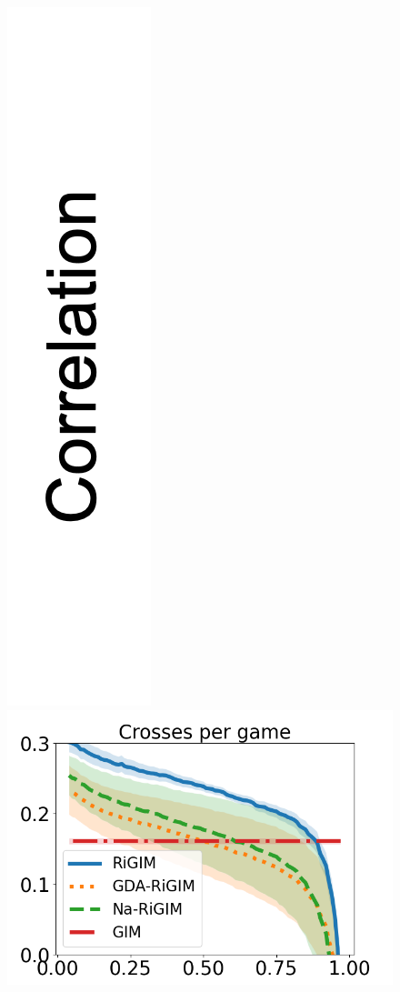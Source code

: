 \documentclass{article}
\begin{document}
\begin{figure}[htbp]
\begin{minipage}{0.01\textwidth}
    \includegraphics[scale=0.12]{figures/correlation_y_label.png}
    \end{minipage}
    \begin{minipage}{0.16\textwidth}
    \centering
    \includegraphics[scale=0.14]{figures/soccer_risk_curve_Crosses_shadow.png}\par

\end{minipage}
\end{figure}
\end{document}
